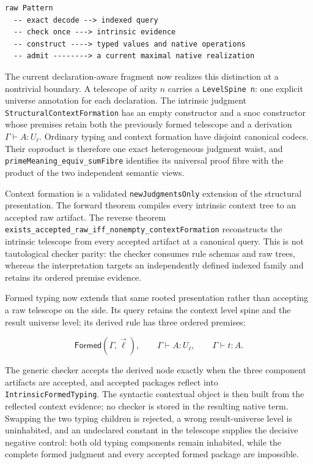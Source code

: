 \documentclass[11pt]{article}
\newcommand{\code}[1]{\texttt{#1}}
\begin{document}
\begin{lstlisting}
raw Pattern
  -- exact decode --> indexed query
  -- check once ---> intrinsic evidence
  -- construct ----> typed values and native operations
  -- admit --------> a current maximal native realization
\end{lstlisting}

The current declaration-aware fragment now realizes this distinction at a
nontrivial boundary.  A telescope of arity $n$ carries a
\code{LevelSpine n}: one explicit universe annotation for each declaration.
The intrinsic judgment \code{StructuralContextFormation} has an empty
constructor and a snoc constructor whose premises retain both the previously
formed telescope and a derivation $\Gamma\vdash A:U_\ell$.  Ordinary typing and
context formation have disjoint canonical codecs.  Their coproduct is therefore
one exact heterogeneous judgment waist, and
\code{primeMeaning\_equiv\_sumFibre} identifies its universal proof fibre with
the product of the two independent semantic views.

Context formation is a validated \code{newJudgmentsOnly} extension of the
structural presentation.  The forward theorem compiles every intrinsic context
tree to an accepted raw artifact.  The reverse theorem
\code{exists\_accepted\_raw\_iff\_nonempty\_contextFormation} reconstructs the
intrinsic telescope from every accepted artifact at a canonical query.  This is
not tautological checker parity: the checker consumes rule schemas and raw trees,
whereas the interpretation targets an independently defined indexed family and
retains its ordered premise evidence.

Formed typing now extends that same rooted presentation rather than accepting a
raw telescope on the side.  Its query retains the context level spine and the
result universe level; its derived rule has three ordered premises:

\[
 \mathsf{Formed}(\Gamma,\vec\ell),\qquad
 \Gamma\vdash A:U_\ell,\qquad
 \Gamma\vdash t:A.
\]

The generic checker accepts the derived node exactly when the three component
artifacts are accepted, and accepted packages reflect into
\code{IntrinsicFormedTyping}.  The syntactic contextual object is then built from
the reflected context evidence; no checker is stored in the resulting native
term.  Swapping the two typing children is rejected, a wrong result-universe
level is uninhabited, and an undeclared constant in the telescope supplies the
decisive negative control: both old typing components remain inhabited, while
the complete formed judgment and every accepted formed package are impossible.
\end{document}

